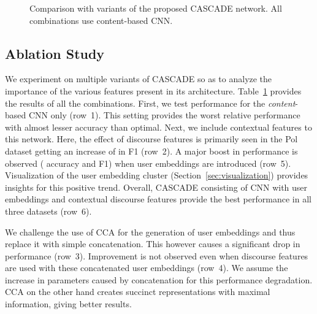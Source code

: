 \documentclass[11pt]{article}
\begin{document}
{\begin{figure}[b!]
\begin{floatrow}
{\begin{tabular}{l|c|c|c|c|c|c|c|c|r}
		\end{tabular}
  		\vspace{0.5cm}
  
}{\caption{\footnotesize{Comparison with variants of the proposed CASCADE network. All combinations use content-based CNN.}}\label{table:variationresults}
}

\end{floatrow}
\end{figure}

\subsection{Ablation Study} \label{sec:ablation}

We experiment on multiple variants of CASCADE so as to analyze the importance of the various features present in its architecture. Table~\ref{table:variationresults} provides the results of all the combinations. First, we test performance for the \textit{content}-based CNN only (row~1). This setting provides the worst relative performance with almost  lesser accuracy than optimal. Next, we include contextual features to this network. Here, the effect of discourse features is primarily seen in the Pol dataset getting an increase of  in F1 (row~2). A major boost in performance is observed ( accuracy and F1) when user embeddings are introduced (row~5). Visualization of the user embedding cluster (Section~\ref{sec:visualization}) provides insights for this positive trend. Overall, CASCADE consisting of CNN with user embeddings and contextual discourse features provide the best performance in all three datasets (row~6).

We challenge the use of CCA for the generation of user embeddings and thus replace it with simple concatenation. This however causes a significant drop in performance (row~3). Improvement is not observed even when discourse features are used with these concatenated user embeddings (row~4). We assume the increase in parameters caused by concatenation for this performance degradation. CCA on the other hand creates succinct representations with maximal information, giving better results. 














}
\end{document}
